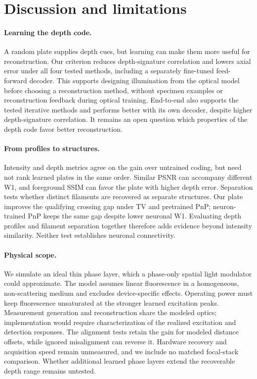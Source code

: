 \section{Discussion and limitations}
\label{sec:discussion}

\paragraph{Learning the depth code.}
A random plate supplies depth cues, but learning can make them more useful for reconstruction. Our criterion reduces depth-signature correlation and lowers axial error under all four tested methods, including a separately fine-tuned feed-forward decoder. This supports designing illumination from the optical model before choosing a reconstruction method, without specimen examples or reconstruction feedback during optical training. End-to-end also supports the tested iterative methods and performs better with its own decoder, despite higher depth-signature correlation. It remains an open question which properties of the depth code favor better reconstruction.

\paragraph{From profiles to structures.}
Intensity and depth metrics agree on the gain over untrained coding, but need not rank learned plates in the same order. Similar PSNR can accompany different W1, and foreground SSIM can favor the plate with higher depth error. Separation tests whether distinct filaments are recovered as separate structures. Our plate improves the qualifying crossing gap under TV and pretrained PnP; neuron-trained PnP keeps the same gap despite lower neuronal W1. Evaluating depth profiles and filament separation together therefore adds evidence beyond intensity similarity. Neither test establishes neuronal connectivity.

\paragraph{Physical scope.}
We simulate an ideal thin phase layer, which a phase-only spatial light modulator could approximate. The model assumes linear fluorescence in a homogeneous, non-scattering medium and excludes device-specific effects. Operating power must keep fluorescence unsaturated at the stronger learned excitation peaks. Measurement generation and reconstruction share the modeled optics; implementation would require characterization of the realized excitation and detection responses. The alignment tests retain the gain for modeled distance offsets, while ignored misalignment can reverse it. Hardware recovery and acquisition speed remain unmeasured, and we include no matched focal-stack comparison. Whether additional learned phase layers extend the recoverable depth range remains untested.


